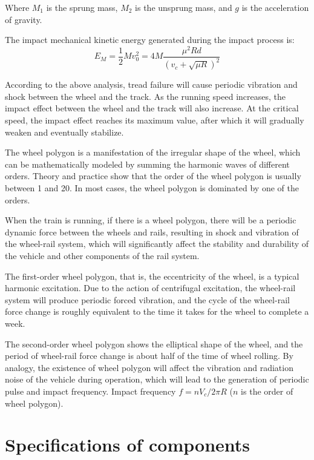 \documentclass{article}
\begin{document}
Where $M_1$ is the sprung mass, $M_2$ is the unsprung mass, and $g$ is the acceleration of gravity.

The impact mechanical kinetic energy generated during the impact process is:
\begin{equation}
    E_M = \frac{1}{2} M v_0^2 = 4 M \frac{\mu^2 R d}{(v_c + \sqrt{\mu R})^2}
    \label{eq:2.27}    
\end{equation}

According to the above analysis, tread failure will cause periodic vibration and shock between the wheel and the track. As the running speed increases, the impact effect between the wheel and the track will also increase. At the critical speed, the impact effect reaches its maximum value, after which it will gradually weaken and eventually stabilize.

The wheel polygon is a manifestation of the irregular shape of the wheel, which can be mathematically modeled by summing the harmonic waves of different orders. Theory and practice show that the order of the wheel polygon is usually between 1 and 20. In most cases, the wheel polygon is dominated by one of the orders.

When the train is running, if there is a wheel polygon, there will be a periodic dynamic force between the wheels and rails, resulting in shock and vibration of the wheel-rail system, which will significantly affect the stability and durability of the vehicle and other components of the rail system.

The first-order wheel polygon, that is, the eccentricity of the wheel, is a typical harmonic excitation. Due to the action of centrifugal excitation, the wheel-rail system will produce periodic forced vibration, and the cycle of the wheel-rail force change is roughly equivalent to the time it takes for the wheel to complete a week.

The second-order wheel polygon shows the elliptical shape of the wheel, and the period of wheel-rail force change is about half of the time of wheel rolling. By analogy, the existence of wheel polygon will affect the vibration and radiation noise of the vehicle during operation, which will lead to the generation of periodic pulse and impact frequency. Impact frequency $f = n V_c / 2 \pi R$ ($n$ is the order of wheel polygon).
\clearpage
\section{Specifications of components}
\end{document}
